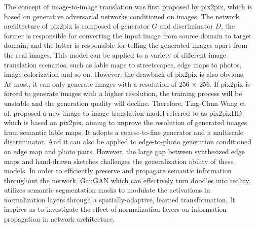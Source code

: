 \documentclass[10pt,twocolumn,letterpaper]{article}
\begin{document}
The concept of image-to-image translation was first proposed by pix2pix\cite{pix2pix}, which is based on generative adversarial networks conditioned on images. 
The network architecture of pix2pix is composed of generator $G$ and discriminator $D$, the former is responsible for converting the input image from source domain to target domain, and the latter is responsible for telling the generated images apart from the real images. 
This model can be applied to a variety of different image translation scenarios, such as lable maps to streetscapes, edge maps to photos, image colorization and so on.
However, the drawback of pix2pix is also obvious. At most, it can only generate images with a resolution of 256 × 256. 
If pix2pix is forced to generate images with a higher resolution, the training process will be unstable and the generation quality will decline. 
Therefore, Ting-Chun Wang et al. proposed a new image-to-image translation model referred to as pix2pixHD\cite{pix2pixhd}, which is based on pix2pix, aiming to improve the resolution of generated images from semantic lable maps. 
It adopts a coarse-to-fine generator and a multiscale discriminator. 
And it can also be applied to edge-to-photo generation conditioned on edge map and photo pairs. 
However, the large gap between synthesized edge maps and hand-drawn sketches challenges the generalization ability of these models.
In order to efficiently preserve and propagate semantic information throughout the network, GauGAN\cite{spade} which can effectively turn doodles into reality, utilizes semantic segmentation masks to modulate the activations in normalization layers through a spatially-adaptive, learned transformation. It inspires us to investigate the effect of normalization layers on information propagation in network architecture.
\end{document}
